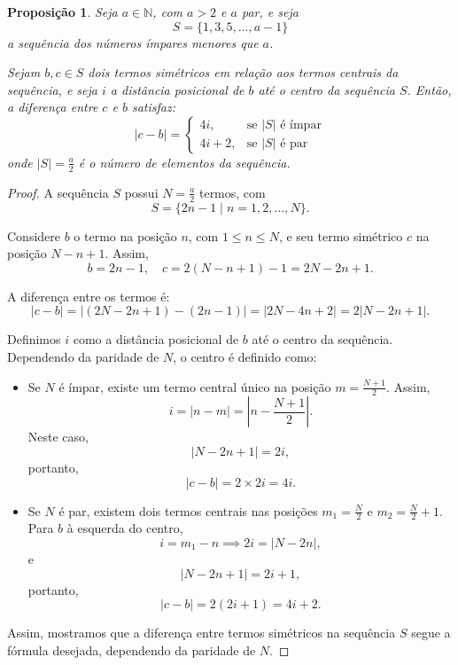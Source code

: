 \documentclass[a4paper,11pt]{article}
\newtheorem{proposition}[theorem]{Proposição}
\theoremstyle{definition}
\theoremstyle{remark}
\begin{document}
	\begin{proposition}
		Seja $a \in \mathbb{N}$, com $a > 2$ e $a$ par, e seja
		\[
		S = \{1, 3, 5, \dotsc, a - 1\}
		\]
		a sequência dos números ímpares menores que $a$.
		
		Sejam $b, c \in S$ dois termos simétricos em relação aos termos centrais da sequência, e seja $i$ a distância posicional de $b$ até o centro da sequência $S$. Então, a diferença entre $c$ e $b$ satisfaz:
		\[
		|c - b| =
		\begin{cases}
			4i, & \text{se } |S| \text{ é ímpar} \\
			4i + 2, & \text{se } |S| \text{ é par}
		\end{cases}
		\]
		onde $|S| = \frac{a}{2}$ é o número de elementos da sequência.
	\end{proposition}
	
	\begin{proof}
		A sequência $S$ possui $N = \frac{a}{2}$ termos, com
		\[
		S = \{2n - 1 \mid n = 1, 2, \dotsc, N\}.
		\]
		
		Considere $b$ o termo na posição $n$, com $1 \leq n \leq N$, e seu termo simétrico $c$ na posição $N - n + 1$. Assim,
		\[
		b = 2n - 1, \quad c = 2(N - n + 1) - 1 = 2N - 2n + 1.
		\]
		
		A diferença entre os termos é:
		\[
		|c - b| = |(2N - 2n + 1) - (2n - 1)| = |2N - 4n + 2| = 2|N - 2n + 1|.
		\]
		
		Definimos $i$ como a distância posicional de $b$ até o centro da sequência. Dependendo da paridade de $N$, o centro é definido como:
		
		\begin{itemize}
			\item Se $N$ é ímpar, existe um termo central único na posição $m = \frac{N+1}{2}$. Assim,
			\[
			i = |n - m| = \left| n - \frac{N+1}{2} \right|.
			\]
			Neste caso,
			\[
			|N - 2n + 1| = 2i,
			\]
			portanto,
			\[
			|c - b| = 2 \times 2i = 4i.
			\]
			
			\item Se $N$ é par, existem dois termos centrais nas posições $m_1 = \frac{N}{2}$ e $m_2 = \frac{N}{2} + 1$. Para $b$ à esquerda do centro,
			\[
			i = m_1 - n \implies 2i = |N - 2n|,
			\]
			e
			\[
			|N - 2n + 1| = 2i + 1,
			\]
			portanto,
			\[
			|c - b| = 2(2i + 1) = 4i + 2.
			\]
		\end{itemize}
		
		Assim, mostramos que a diferença entre termos simétricos na sequência $S$ segue a fórmula desejada, dependendo da paridade de $N$.
		
	\end{proof}
	
\end{document}
